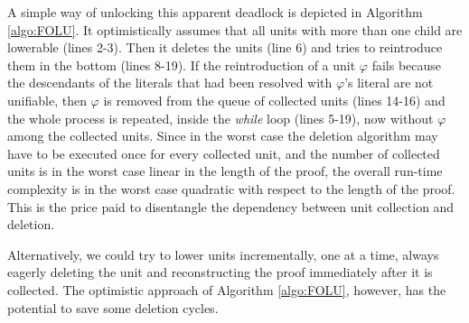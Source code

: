 A simple way of unlocking this apparent deadlock is depicted in Algorithm \ref{algo:FOLU}. It optimistically assumes that all units with more than one child are lowerable (lines 2-3). Then it deletes the units (line 6) and tries to reintroduce them in the bottom (lines 8-19). If the reintroduction of a unit $\varphi$ fails because the descendants of the literals that had been resolved with $\varphi$'s literal are not unifiable, then $\varphi$ is removed from the queue of collected units (lines 14-16) and the whole process is repeated, inside the \emph{while} loop (lines 5-19), now without $\varphi$ among the collected units. Since in the worst case the deletion algorithm may have to be executed once for every collected unit, and the number of collected units is in the worst case linear in the length of the proof, the overall run-time complexity is in the worst case quadratic with respect to the length of the proof. This is the price paid to disentangle the dependency between unit collection and deletion.

Alternatively, we could try to lower units incrementally, one at a time, always eagerly deleting the unit and reconstructing the proof immediately after it is collected. The optimistic approach of Algorithm \ref{algo:FOLU}, however, has the potential to save some deletion cycles.




